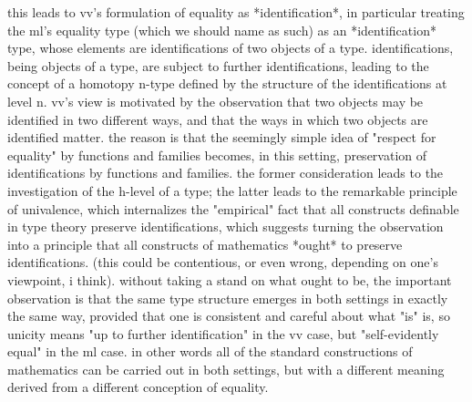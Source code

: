 \documentclass[11pt]{article}
\theoremstyle{remark}
\theoremstyle{definition}
\begin{document}
this leads to vv's formulation of equality as *identification*, in particular treating the ml's equality type (which we should name as such) as an *identification* type, whose elements are identifications of two objects of a type.  identifications, being objects of a type, are subject to further identifications, leading to the concept of a homotopy n-type defined by the structure of the identifications at level n.  vv's view is motivated by the observation that two objects may be identified in two different ways, and that the ways in which two objects are identified matter.  the reason is that the seemingly simple idea of "respect for equality" by functions and families becomes, in this setting, preservation of identifications by functions and families.  the former consideration leads to the investigation of the h-level of a type; the latter leads to the remarkable principle of univalence, which internalizes the "empirical" fact that all constructs definable in type theory preserve identifications, which suggests turning the observation into a principle that all constructs of mathematics *ought* to preserve identifications.  (this could be contentious, or even wrong, depending on one's viewpoint, i think).  without taking a stand on what ought to be, the important observation is that the same type structure emerges in both settings in exactly the same way, provided that one is consistent and careful about what "is" is, so unicity means "up to further identification" in the vv case, but "self-evidently equal" in the ml case.  in other words all of the standard constructions of mathematics can be carried out in both settings, but with a different meaning derived from a different conception of equality.
\end{document}
